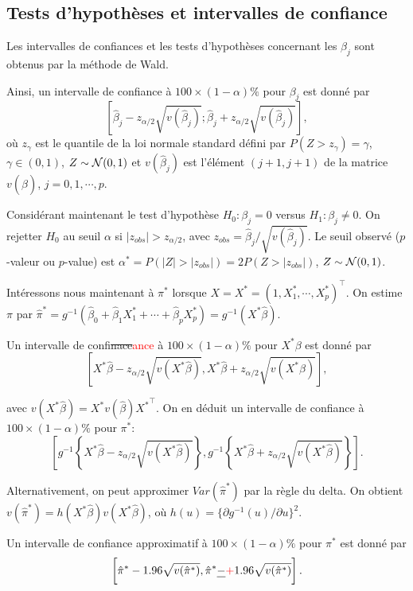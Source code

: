 \documentclass[11pt]{article}
\begin{document}
\subsection{Tests d'hypothèses et intervalles de confiance}
Les intervalles de confiances et les tests d'hypothèses concernant les $\beta_j$ sont obtenus par la méthode de Wald.

\noindent Ainsi, un intervalle de confiance \`a $100\times(1-\alpha)\%$ pour $\beta_j$ est donné par $$[\hat\beta_j - z_{\alpha/2} \sqrt{v(\hat\beta_j)};\hat\beta_j + z_{\alpha/2} \sqrt{v(\hat\beta_j)}],$$
où $z_{\gamma}$ est le quantile de la loi normale standard défini par $P(Z>z_{\gamma})=\gamma$, $\gamma \in (0,1)$, $Z \sim {\cal N}(0,1)$ et $v(\hat\beta_j)$ est l'élément $(j+1,j+1)$ de la matrice $v(\hat\beta)$, $j=0,1,\cdots,p$.

\noindent Considérant maintenant le test d'hypothèse $H_0: \beta_j = 0$ versus $H_1: \beta_j \neq 0$. On rejetter $H_0$ au seuil $\alpha$ si $|z_{obs}|>z_{\alpha/2}$, avec $z_{obs}=\hat\beta_j/\sqrt{v(\hat\beta_j)}$. Le seuil observé ($p$-valeur ou $p$-value) est $\alpha^*=P(|Z|>|z_{obs}|)=2P(Z>|z_{obs}|)$, $Z \sim {\cal N}(0,1)$.

\noindent Intéressons nous maintenant \`a $\pi^*$ lorsque $X=X^*=(1,X_1^*,\cdots,X_p^*)^\top$. On estime $\pi$ par $\hat\pi^*=g^{-1}(\hat\beta_0+\hat\beta_1 X_{1}^* + \cdots + \hat\beta_p X_{p}^*)=g^{-1}(X^*\hat\beta)$.

\noindent Un intervalle de confi\sout{nace}\textcolor{red}{ance} \`a $100\times(1-\alpha)\%$ pour $X^*\beta$ est donné par 
$$\left[ X^*\hat\beta - z_{\alpha/2}\sqrt{v(X^*\hat\beta)}   , X^*\hat\beta + z_{\alpha/2}\sqrt{v(X^*\hat\beta)}\right],$$

\noindent avec $v(X^*\hat\beta)=X^* v(\hat\beta) {X^*}^\top$. On en déduit un intervalle de confiance \`a $100\times(1-\alpha)\%$ pour $\pi^*$:
$$\left[ g^{-1}\left\{X^*\hat\beta - z_{\alpha/2}\sqrt{v(X^*\hat\beta)}\right\},g^{-1}\left\{X^*\hat\beta + z_{\alpha/2}\sqrt{v(X^*\hat\beta)}\right\}   \right].$$

\noindent Alternativement, on peut approximer $Var(\hat\pi^*)$ par la règle du delta. On obtient $v(\hat\pi^*)=h(X^*\hat\beta)v(X^*\hat\beta)$, où $h(u)=\{\partial g^{-1}(u)/\partial u\}^2$. 

\noindent Un intervalle de confiance approximatif \`a $100\times(1-\alpha)\%$ pour $\pi^*$ est donné par 
$$\left[\hat\pi^* - 1.96 \sqrt{v(\hat\pi^*)},\hat\pi^* \sout{-}\textcolor{red}{+} 1.96 \sqrt{v(\hat\pi^*)}\right].$$
\end{document}
